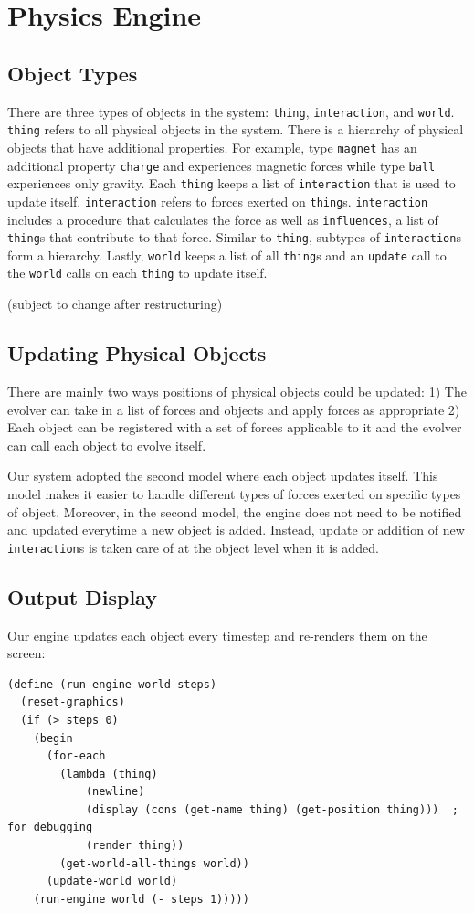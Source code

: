 \documentclass{article}
\begin{document}
\section{Physics Engine}
\subsection{Object Types}
There are three types of objects in the system: \texttt{thing}, \texttt{interaction}, and \texttt{world}. \texttt{thing} refers to all physical objects in the system. There is a hierarchy of physical objects that have additional properties. For example, type \texttt{magnet} has an additional property \texttt{charge} and experiences magnetic forces while type \texttt{ball} experiences only gravity. Each \texttt{thing} keeps a list of \texttt{interaction} that is used to update itself. \texttt{interaction} refers to forces exerted on \texttt{thing}s. \texttt{interaction} includes a procedure that calculates the force as well as \texttt{influences}, a list of \texttt{thing}s that contribute to that force. Similar to \texttt{thing}, subtypes of \texttt{interaction}s form a hierarchy. Lastly, \texttt{world} keeps a list of all \texttt{thing}s and an \texttt{update} call to the \texttt{world} calls on each \texttt{thing} to update itself.

(subject to change after restructuring)

\subsection{Updating Physical Objects}
There are mainly two ways positions of physical objects could be updated: 1) The evolver can take in a list of forces and objects and apply forces as appropriate 2) Each object can be registered with a set of forces applicable to it and the evolver can call each object to evolve itself.

Our system adopted the second model where each object updates itself. This model makes it easier to handle different types of forces exerted on specific types of object. Moreover, in the second model, the engine does not need to be notified and updated everytime a new object is added. Instead, update or addition of new \texttt{interaction}s is taken care of at the object level when it is added.

\subsection{Output Display}
Our engine updates each object every timestep and re-renders them on the screen:
\begin{verbatim}
(define (run-engine world steps)
  (reset-graphics)
  (if (> steps 0)
    (begin 
      (for-each 
        (lambda (thing)
            (newline)
            (display (cons (get-name thing) (get-position thing)))  ; for debugging
            (render thing))
        (get-world-all-things world))
      (update-world world)
    (run-engine world (- steps 1)))))
\end{verbatim}
\end{document}

